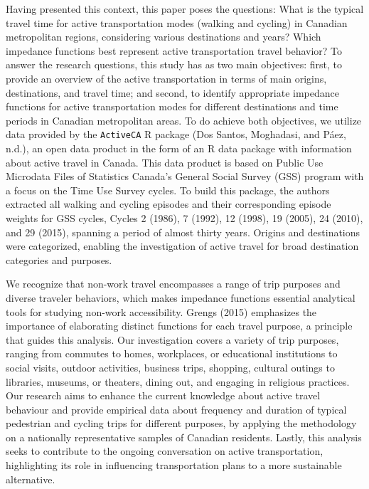 \documentclass[preprint, 3p,
authoryear]{elsarticle} %
\begin{document}
Having presented this context, this paper poses the questions: What is
the typical travel time for active transportation modes (walking and
cycling) in Canadian metropolitan regions, considering various
destinations and years? Which impedance functions best represent active
transportation travel behavior? To answer the research questions, this
study has as two main objectives: first, to provide an overview of the
active transportation in terms of main origins, destinations, and travel
time; and second, to identify appropriate impedance functions for active
transportation modes for different destinations and time periods in
Canadian metropolitan areas. To do achieve both objectives, we utilize
data provided by the \texttt{ActiveCA} R package (Dos Santos, Moghadasi,
and Páez, n.d.), an open data product in the form of an R data package
with information about active travel in Canada. This data product is
based on Public Use Microdata Files of Statistics Canada's General
Social Survey (GSS) program with a focus on the Time Use Survey cycles.
To build this package, the authors extracted all walking and cycling
episodes and their corresponding episode weights for GSS cycles, Cycles
2 (1986), 7 (1992), 12 (1998), 19 (2005), 24 (2010), and 29 (2015),
spanning a period of almost thirty years. Origins and destinations were
categorized, enabling the investigation of active travel for broad
destination categories and purposes.

We recognize that non-work travel encompasses a range of trip purposes
and diverse traveler behaviors, which makes impedance functions
essential analytical tools for studying non-work accessibility. Grengs
(2015) emphasizes the importance of elaborating distinct functions for
each travel purpose, a principle that guides this analysis. Our
investigation covers a variety of trip purposes, ranging from commutes
to homes, workplaces, or educational institutions to social visits,
outdoor activities, business trips, shopping, cultural outings to
libraries, museums, or theaters, dining out, and engaging in religious
practices. Our research aims to enhance the current knowledge about
active travel behaviour and provide empirical data about frequency and
duration of typical pedestrian and cycling trips for different purposes,
by applying the methodology on a nationally representative samples of
Canadian residents. Lastly, this analysis seeks to contribute to the
ongoing conversation on active transportation, highlighting its role in
influencing transportation plans to a more sustainable alternative.
\end{document}
